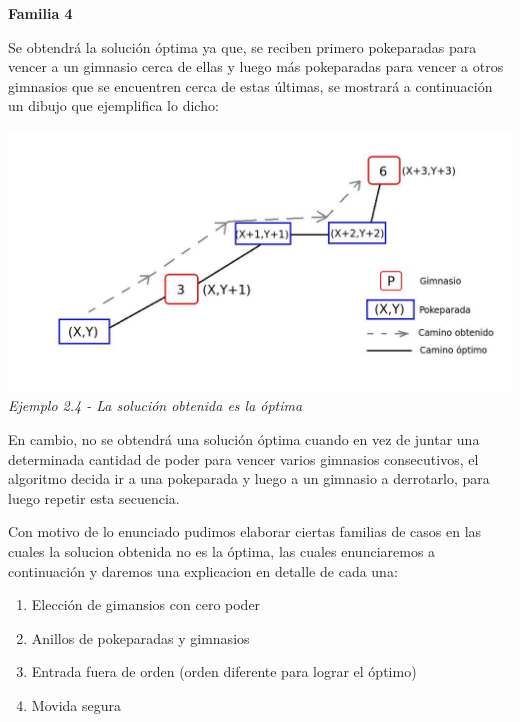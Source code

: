 \begin{center}
\textbf{Familia 4}
\end{center}

Se obtendr\'a la soluci\'on \'optima ya que, se reciben primero pokeparadas para vencer a un gimnasio cerca de ellas y luego m\'as pokeparadas para vencer a otros gimnasios que se encuentren cerca de estas \'ultimas, se mostrar\'a a continuaci\'on un dibujo que ejemplifica lo dicho:

\vspace*{0.3cm} \vspace*{0.3cm}
  \begin{center}
\includegraphics[scale=0.60]{./EJ2/optima.jpeg}
\\{\textit{Ejemplo 2.4 - La soluci\'on obtenida es la \'optima}}
  \end{center}
  \vspace*{0.3cm}

En cambio, no se obtendr\'a una soluci\'on \'optima cuando en vez de juntar una determinada cantidad de poder para vencer varios gimnasios consecutivos, el algoritmo decida ir a una pokeparada y luego a un gimnasio a derrotarlo, para luego repetir esta secuencia.

Con motivo de lo enunciado pudimos elaborar ciertas familias de casos en las cuales la solucion obtenida no es la \'optima, las cuales enunciaremos a continuaci\'on y daremos una explicacion en detalle de cada una:

\begin{enumerate}
\item Elección de gimansios con cero poder 
\item Anillos de pokeparadas y gimnasios
\item Entrada fuera de orden (orden diferente para lograr el óptimo)
\item Movida segura
\end{enumerate}


